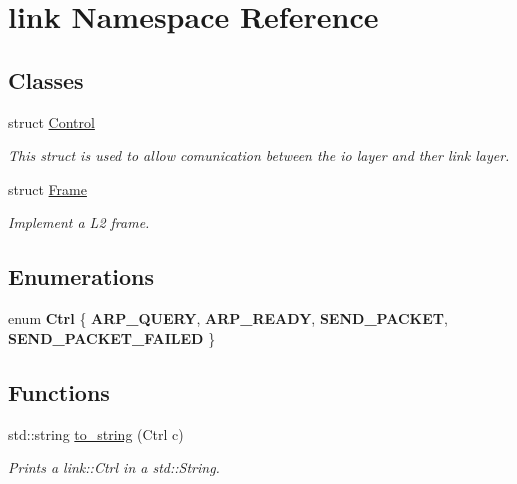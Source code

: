 \hypertarget{namespacelink}{}\section{link Namespace Reference}
\label{namespacelink}
\subsection*{Classes}
\begin{DoxyCompactItemize}
\item 
struct \hyperlink{structlink_1_1Control}{Control}
\begin{DoxyCompactList}\small\item\em This struct is used to allow comunication between the io layer and ther link layer. \end{DoxyCompactList}\item 
struct \hyperlink{structlink_1_1Frame}{Frame}
\begin{DoxyCompactList}\small\item\em Implement a L2 frame. \end{DoxyCompactList}\end{DoxyCompactItemize}
\subsection*{Enumerations}
\begin{DoxyCompactItemize}
\item 
enum {\bfseries Ctrl} \{ {\bfseries A\+R\+P\+\_\+\+Q\+U\+E\+RY}, 
{\bfseries A\+R\+P\+\_\+\+R\+E\+A\+DY}, 
{\bfseries S\+E\+N\+D\+\_\+\+P\+A\+C\+K\+ET}, 
{\bfseries S\+E\+N\+D\+\_\+\+P\+A\+C\+K\+E\+T\+\_\+\+F\+A\+I\+L\+ED}
 \}\hypertarget{namespacelink_a1d79bf748d9bf002fe132d4b611d9a34}{}\label{namespacelink_a1d79bf748d9bf002fe132d4b611d9a34}

\end{DoxyCompactItemize}
\subsection*{Functions}
\begin{DoxyCompactItemize}
\item 
std\+::string \hyperlink{namespacelink_accbf2c6561d1df2054160547a5697285}{to\+\_\+string} (Ctrl c)
\begin{DoxyCompactList}\small\item\em Prints a link\+::\+Ctrl in a std\+::\+String. \end{DoxyCompactList}\end{DoxyCompactItemize}


